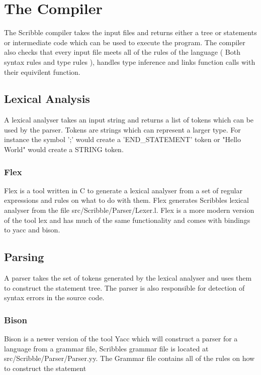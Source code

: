 \documentclass[]{final_report}
\begin{document}
\chapter{The Compiler}

The Scribble compiler takes the input files and returns either a tree or statements or intermediate code which can be used to execute the program. The compiler also checks that every input file meets all of the rules of the language ( Both syntax rules and type rules ), handles type inference and links function calls with their equivilent function.

\section{Lexical Analysis}

A lexical analyser takes an input string and returns a list of tokens which can be used by the parser. Tokens are strings which can represent a larger type. For instance the symbol ';' would create a 'END\_STATEMENT' token or "Hello World" would create a STRING token.

\subsection{Flex}

Flex is a tool written in C to generate a lexical analyser from a set of regular expressions and rules on what to do with them. Flex generates Scribbles lexical analyser from the file src/Scribble/Parser/Lexer.l. Flex is a more modern version of the tool lex and has much of the same functionality and comes with bindings to yacc and bison.

\section{Parsing}

A parser takes the set of tokens generated by the lexical analyser and uses them to construct the statement tree. The parser is also responsible for detection of syntax errors in the source code.

\subsection{Bison}

Bison is a newer version of the tool Yacc which will construct a parser for a language from a grammar file, Scribbles grammar file is located at src/Scribble/Parser/Parser.yy. The Grammar file contains all of the rules on how to construct the statement 
\end{document}
